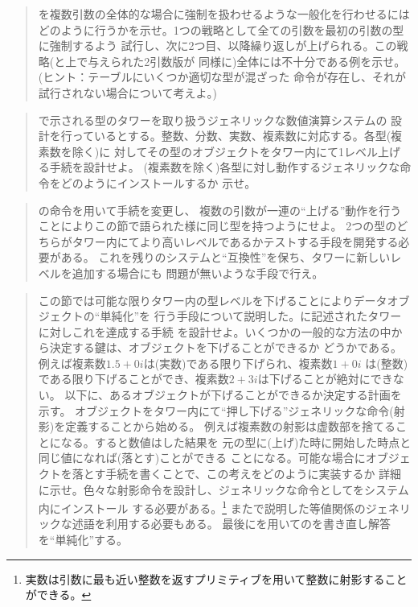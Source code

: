 \begin{quote}
を複数引数の全体的な場合に強制を扱わせるような一般化を行わせるには
どのように行うかを示せ。1つの戦略として全ての引数を最初の引数の型に強制するよう
試行し、次に2つ目、以降繰り返しが上げられる。この戦略(と上で与えられた2引数版が
同様に)全体には不十分である例を示せ。(ヒント：テーブルにいくつか適切な型が混ざった
命令が存在し、それが試行されない場合について考えよ。)
\end{quote}

\begin{quote}
で示される型のタワーを取り扱うジェネリックな数値演算システムの
設計を行っているとする。整数、分数、実数、複素数に対応する。各型(複素数を除く)に
対してその型のオブジェクトをタワー内にて1レベル上げる手続を設計せよ。
(複素数を除く)各型に対し動作するジェネリックな命令をどのようにインストールするか
示せ。
\end{quote}

\begin{quote}
の命令を用いて手続を変更し、
複数の引数が一連の``上げる''動作を行うことによりこの節で語られた様に同じ型を持つようにせよ。
2つの型のどちらがタワー内にてより高いレベルであるかテストする手段を開発する必要がある。
これを残りのシステムと``互換性''を保ち、タワーに新しいレベルを追加する場合にも
問題が無いような手段で行え。
\end{quote}

\begin{quote}
この節では可能な限りタワー内の型レベルを下げることによりデータオブジェクトの``単純化''を
行う手段について説明した。に記述されたタワーに対しこれを達成する手続
を設計せよ。いくつかの一般的な方法の中から決定する鍵は、オブジェクトを下げることができるか
どうかである。例えば複素数\( 1.5 + 0i \)は(実数)である限り下げられ、複素数\( 1 + 0i \)
は(整数)である限り下げることができ、複素数\( 2 + 3i \)は下げることが絶対にできない。
以下に、あるオブジェクトが下げることができるか決定する計画を示す。
オブジェクトをタワー内にて``押し下げる''ジェネリックな命令(射影)を定義することから始める。
例えば複素数の射影は虚数部を捨てることになる。すると数値はした結果を
元の型に(上げ)た時に開始した時点と同じ値になれば(落とす)ことができる
ことになる。可能な場合にオブジェクトを落とす手続を書くことで、この考えをどのように実装するか
詳細に示せ。色々な射影命令を設計し、ジェネリックな命令としてをシステム内にインストール
する必要がある。\footnote{
実数は引数に最も近い整数を返すプリミティブを用いて整数に射影することができる。}
またで説明した等値関係のジェネリックな述語を利用する必要もある。
最後にを用いてのを書き直し解答を``単純化''する。
\end{quote}

